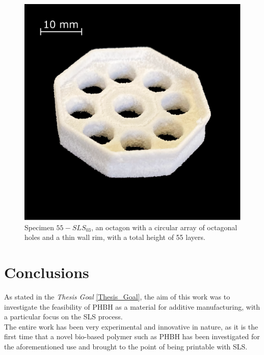 \documentclass{article}
\begin{document}
        \begin{figure}[h!]
            \centering
            \includegraphics[width=\textwidth]{Pictures/Printed_parts/Fixed/octagon_holes.eps}
            \caption{Specimen $55-SLS_{03}$, an octagon with a circular array of octagonal holes and a thin wall rim, with a total height of 55 layers.}
            \label{fig:printed_specimens_octagonholes}
        \end{figure}
        

        \clearpage

    
    \section{Conclusions\label{conclusions}}

    As stated in the \textit{Thesis Goal} \ref{Thesis_Goal}, the aim of this work was to investigate the feasibility of PHBH as a 
    material for additive manufacturing, with a particular focus on the SLS process. \\ 

    The entire work has been very experimental and innovative in nature, as it is the first time that a novel bio-based polymer such as PHBH has been investigated 
    for the aforementioned use and brought to the point of being printable with SLS. \\
    
\end{document}
